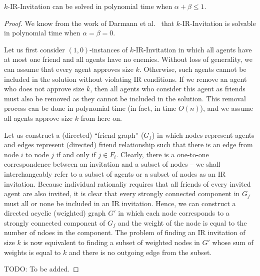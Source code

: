 \begin{theorem} \label{SIP:thm:IR_invitation_P}
	$k$-IR-Invitation can be solved in polynomial time when $\alpha + \beta \leq 1$.
\end{theorem} 
\begin{proof}
We know from the work of Darmann et al.~\cite{GASP12WINE} that $k$-IR-Invitation is solvable in polynomial time when $\alpha = \beta = 0$.
	
	Let us first consider $(1, 0)$-instances of $k$-IR-Invitation in which all agents have at most one friend and all agents have no enemies. Without loss of generality, we can assume that every agent approves size $k$. Otherwise, such agents cannot be included in the solution without violating IR conditions. If we remove an agent who does not approve size $k$, then all agents who consider this agent as friends must also be removed as they cannot be included in the solution. This removal process can be done in polynomial time (in fact, in time $O(n)$), and we assume all agents approve size $k$ from here on. 
	
	Let us construct a (directed) ``friend graph'' ($G_f$) in which nodes represent agents and edges represent (directed) friend relationship such that there is an edge from node $i$ to node $j$ if and only if $j \in F_i$. Clearly, there is a one-to-one correspondence between an invitation and a subset of nodes -- we shall interchangeably refer to a subset of agents or a subset of nodes as an IR invitation. Because individual rationaliy requires that all friends of every invited agent are also invited, it is clear that every strongly connected component in $G_f$ must all or none be included in an IR invitation. Hence, we can construct a directed acyclic (weighted) graph $G'$ in which each node corresponds to a strongly connected component of $G_f$ and the weight of the node is equal to the number of ndoes in the component. The problem of finding an IR invitation of size $k$ is now equivalent to finding a subset of weighted nodes in $G'$ whose sum of weights is equal to $k$ and there is no outgoing edge from the subset. 

TODO: To be added.

	
\end{proof}




